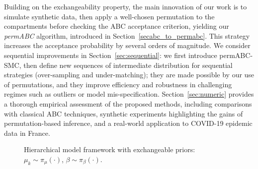 \documentclass[11pt,a4paper]{article}
\theoremstyle{plain}
\theoremstyle{definition}
\theoremstyle{remark}
\begin{document}
Building on the exchangeability property, the main innovation of our work is to simulate synthetic data, then apply a well-chosen permutation to the compartments before checking the ABC acceptance criterion, yielding our \emph{permABC} algorithm, introduced in Section~\ref{secabc_to_permabc}. This strategy increases the acceptance probability by several orders of magnitude. 
We consider sequential improvements in Section~\ref{sec:sequential}: we first introduce permABC-SMC, then  define new sequences of intermediate distribution for sequential strategies (over-sampling and under-matching); they are made possible by our use of permutations, and they improve efficiency and robustness in challenging regimes such as outliers or model mis-specification. Section~\ref{sec:numeric} provides a thorough empirical assessment of the proposed methods, including comparisons with classical ABC techniques, synthetic experiments highlighting the gains of permutation-based inference, and a real-world application to COVID-19 epidemic data in France.

\begin{figure}[ht]
\begin{center}
\end{center}
\caption{Hierarchical model framework with exchangeable priors: $\mu_k \sim \pi_\mu(\cdot)$, $\beta \sim \pi_\beta(\cdot)$.}
\label{fig:hier}
\end{figure}
\end{document}
